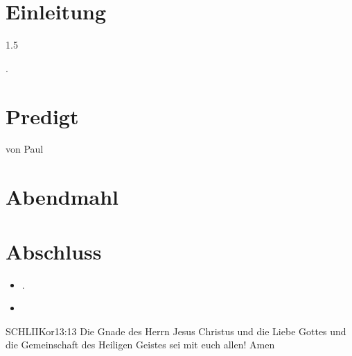 \documentclass[fontsize=14pt]{mybib}
\newcommand{\Name}{Paul}
\begin{document}
\section{Einleitung}
\begin{spacing}{1.5}
      
\end{spacing}
.
\section{Predigt}
    von \Name{}
\section{Abendmahl}

\section{Abschluss}
\begin{itemize}
    \item [] .
    \item [] 
\end{itemize}
\begin{bibelbox}{SCHL}{IIKor}{13:13}
    Die Gnade des Herrn Jesus Christus und die Liebe Gottes und die Gemeinschaft des Heiligen Geistes sei mit euch allen! Amen
\end{bibelbox}
\end{document}
